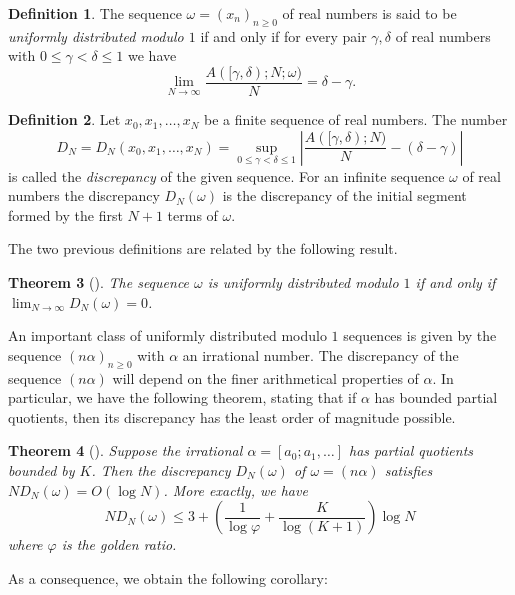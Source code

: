 \documentclass[11pt,reqno]{amsart}
\numberwithin{equation}{section}
\theoremstyle{plain}
\newtheorem{theorem}{Theorem}
\theoremstyle{definition}
\newtheorem{definition}[theorem]{Definition}
\theoremstyle{remark}
\renewcommand{\phi}{\varphi}
\begin{document}
\begin{definition}
 The sequence $\omega=(x_n)_{n\geq 0}$ of real numbers is said to be 
 {\it uniformly distributed modulo $1$} if and only if for every pair $\gamma,\delta$ of real numbers with $0\leq \gamma<\delta\leq 1$ we have
 \[
 \lim_{N\to \infty} \frac{A([\gamma,\delta);N;\omega)}{N}=\delta-\gamma.
 \]
 \end{definition}
 
 \begin{definition}
 Let $x_0,x_1,\ldots, x_N$ be a finite sequence of real numbers. The number
 \[
 D_N=D_N(x_0,x_1,\ldots, x_N)=\sup_{0\leq \gamma<\delta\leq 1}\left| \frac{A([\gamma,\delta);N)}{N}-(\delta-\gamma)\right|
 \]
 is called the {\it discrepancy} of the given sequence. For an infinite sequence $\omega$ of real numbers the discrepancy $D_{N}(\omega)$ is the discrepancy of the initial segment formed by the first $N+1$ terms of $\omega$.
\end{definition}

The two previous definitions are related by the following result.

\begin{theorem}[\protect{\kern-0.5em}\cite{KuNi}]
 The sequence $\omega$ is uniformly distributed modulo $1$ if and only if $\lim_{N\to \infty}D_N(\omega)=0$.
\end{theorem}

An important class of  uniformly distributed modulo $1$ sequences is given by the sequence $(n\alpha)_{n\geq 0}$ with $\alpha$ an irrational number. The discrepancy of the sequence $(n\alpha)$ will depend on the finer arithmetical properties of $\alpha$. In particular, we have the following theorem, stating that if $\alpha$ has bounded partial quotients, then its discrepancy has the least order of magnitude possible.

\begin{theorem}[\protect{\kern-0.3em}\cite{KuNi}]
\label{theor:KN2}
 Suppose the irrational $\alpha=[a_0;a_1,\ldots]$ has  partial quotients bounded by $K$. Then the discrepancy $D_N(\omega)$ of $\omega=(n\alpha)$ satisfies $ND_N(\omega)=O(\log N)$. More exactly, we have
\begin{equation}
 ND_N(\omega)\leq 3+\left(\frac{1}{\log \phi}+\frac{K}{\log(K+1)}\right)\log N
\end{equation}
where $\phi$ is the golden ratio.
\end{theorem}

As a consequence, we obtain the following corollary:
\end{document}
